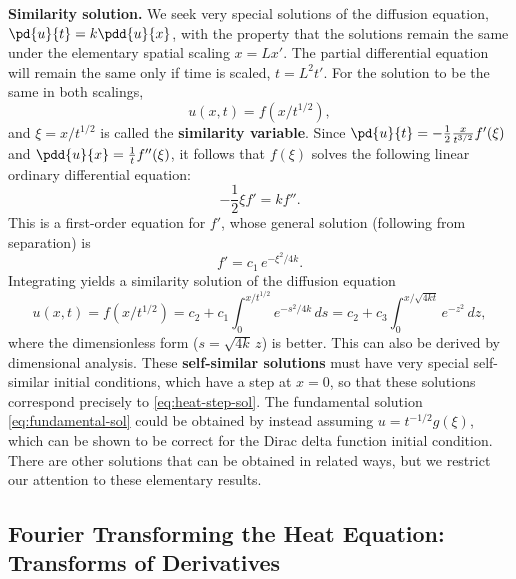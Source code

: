 \textbf{Similarity solution.}  We seek very special solutions of the diffusion equation, $\pd{u}{t} = k\pdd{u}{x}$, with the property that the solutions remain the same under the elementary spatial scaling $x = Lx'$.  The partial differential equation will remain the same only if time is scaled, $t = L^2 t'$.  For the solution to be the same in both scalings,
\[
u(x,t) = f(x/t^{1/2}),
\]
and $\xi = x/t^{1/2}$ is called the \textbf{similarity variable}.  Since $\pd{u}{t} = -\frac{1}{2}\frac{x}{t^{3/2}}f'(\xi)$ and $\pdd{u}{x} = \frac{1}{t}f''(\xi)$, it follows that $f(\xi)$ solves the following linear ordinary differential equation:
\[
-\frac{1}{2}\xi f' = kf''.
\]
This is a first-order equation for $f'$, whose general solution (following from separation) is
\[
f' = c_1\,e^{-\xi^2/4k}.
\]
Integrating yields a similarity solution of the diffusion equation
\[
u(x,t) = f(x/t^{1/2}) = c_2 + c_1\int_0^{x/t^{1/2}} e^{-s^2/4k}\,ds = c_2 + c_3\int_0^{x/\sqrt{4kt}} e^{-z^2}\,dz,
\]
where the dimensionless form ($s = \sqrt{4k}\,z$) is better.  This can also be derived by dimensional analysis.  These \textbf{self-similar solutions} must have very special self-similar initial conditions, which have a step at $x = 0$, so that these solutions correspond precisely to \eqref{eq:heat-step-sol}.  The fundamental solution \eqref{eq:fundamental-sol} could be obtained by instead assuming $u = t^{-1/2}g(\xi)$, which can be shown to be correct for the Dirac delta function initial condition.  There are other solutions that can be obtained in related ways, but we restrict our attention to these elementary results.

\subsection{Fourier Transforming the Heat Equation: Transforms of Derivatives}
\label{subsec:ft-derivatives}

